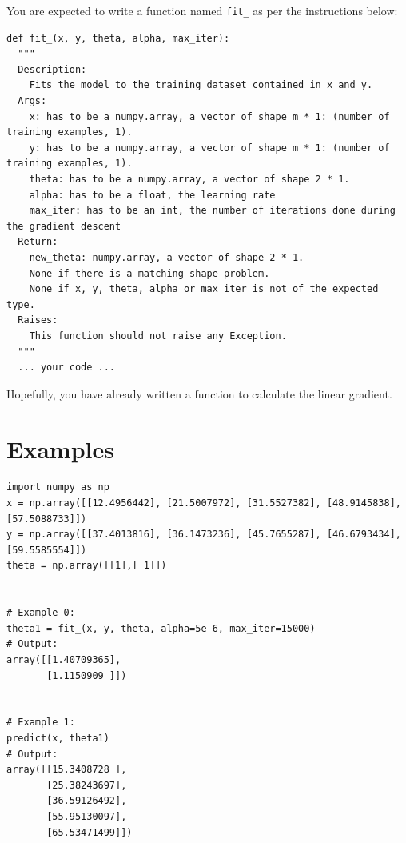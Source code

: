 \documentclass{42-en}
\begin{document}
You are expected to write a function named \texttt{fit\_} as per the instructions below:

\begin{verbatim}
def fit_(x, y, theta, alpha, max_iter):
  """
  Description:
    Fits the model to the training dataset contained in x and y.
  Args:
    x: has to be a numpy.array, a vector of shape m * 1: (number of training examples, 1).
    y: has to be a numpy.array, a vector of shape m * 1: (number of training examples, 1).
    theta: has to be a numpy.array, a vector of shape 2 * 1.
    alpha: has to be a float, the learning rate
    max_iter: has to be an int, the number of iterations done during the gradient descent
  Return:
    new_theta: numpy.array, a vector of shape 2 * 1.
    None if there is a matching shape problem.
    None if x, y, theta, alpha or max_iter is not of the expected type.
  Raises:
    This function should not raise any Exception.
  """
  ... your code ...
\end{verbatim}

Hopefully, you have already written a function to calculate the linear gradient.


\section*{Examples}
\begin{verbatim}
import numpy as np
x = np.array([[12.4956442], [21.5007972], [31.5527382], [48.9145838], [57.5088733]])
y = np.array([[37.4013816], [36.1473236], [45.7655287], [46.6793434], [59.5585554]])
theta = np.array([[1],[ 1]])


# Example 0:
theta1 = fit_(x, y, theta, alpha=5e-6, max_iter=15000)
# Output:
array([[1.40709365],
       [1.1150909 ]])


# Example 1:
predict(x, theta1)
# Output:
array([[15.3408728 ],
       [25.38243697],
       [36.59126492],
       [55.95130097],
       [65.53471499]])
\end{verbatim}

\end{document}
